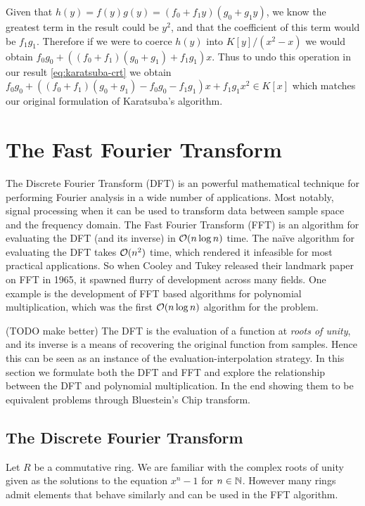 \medskip 

Given that $h(y) = f(y)g(y) = (f_0 + f_1y)(g_0 + g_1 y)$, we know the greatest term in the result could be $y^2$, and that the coefficient of this term would be $f_1g_1$. Therefore if we were to coerce $h(y)$ into $K[y]/(x^2 - x)$ we would obtain $f_0g_0 + ((f_0 + f_1)(g_0 + g_1) + f_1g_1)x$. Thus to undo this operation in our result \eqref{eq:karatsuba-crt} we obtain $f_0g_0 + ((f_0 + f_1)(g_0 + g_1) - f_0g_0 - f_1g_1)x + f_1g_1x^2 \in K[x]$ which matches our original formulation of Karatsuba's algorithm.

\section{The Fast Fourier Transform}


The Discrete Fourier Transform (DFT) is an powerful mathematical technique for performing Fourier analysis in a wide number of applications. Most notably, signal processing when it can be used to transform data between sample space and the frequency domain. The Fast Fourier Transform (FFT) is an algorithm for evaluating the DFT (and its inverse) in $\mathcal O(n \log n)$ time. The na\"{i}ve algorithm for evaluating the DFT takes $\mathcal O(n^2)$ time, which rendered it infeasible for most practical applications. So when Cooley and Tukey released their landmark paper on FFT in 1965, it spawned flurry of development across many fields. One example is the development of FFT based algorithms for polynomial multiplication, which was the first $\mathcal O(n \log n)$ algorithm for the problem.


(TODO make better)
The DFT is the evaluation of a function at \textit{roots of unity}, and its inverse is a means of recovering the original function from samples. Hence this can be seen as an instance of the evaluation-interpolation strategy. 
In this section we formulate both the DFT and FFT and explore the relationship between the DFT and polynomial multiplication. In the end showing them to be equivalent problems through Bluestein's Chip transform.

\subsection{The Discrete Fourier Transform}

Let $R$ be a commutative ring. We are familiar with the complex roots of unity given as the solutions to the equation $x^n - 1$ for $n \in {\mathbb N}$. However many rings admit elements that behave similarly and can be used in the FFT algorithm. 

